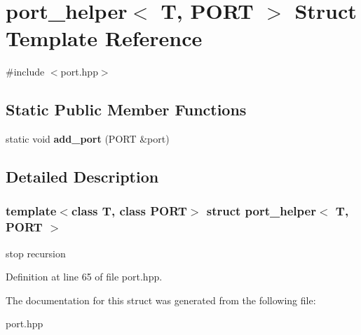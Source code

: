 \hypertarget{structport__helper_3_01_t_00_01_p_o_r_t_01_4}{}\section{port\+\_\+helper$<$ T, P\+O\+RT $>$ Struct Template Reference}
\label{structport__helper_3_01_t_00_01_p_o_r_t_01_4}


{\ttfamily \#include $<$port.\+hpp$>$}

\subsection*{Static Public Member Functions}
\begin{DoxyCompactItemize}
\item 
\hypertarget{structport__helper_3_01_t_00_01_p_o_r_t_01_4_a36f2f2af2c82df2e2ebd748c69e9e6c4}{}\label{structport__helper_3_01_t_00_01_p_o_r_t_01_4_a36f2f2af2c82df2e2ebd748c69e9e6c4} 
static void {\bfseries add\+\_\+port} (P\+O\+RT \&port)
\end{DoxyCompactItemize}


\subsection{Detailed Description}
\subsubsection*{template$<$class T, class P\+O\+RT$>$\newline
struct port\+\_\+helper$<$ T, P\+O\+R\+T $>$}

stop recursion 

Definition at line 65 of file port.\+hpp.



The documentation for this struct was generated from the following file\+:\begin{DoxyCompactItemize}
\item 
port.\+hpp\end{DoxyCompactItemize}

